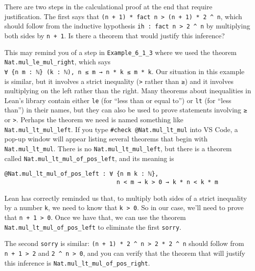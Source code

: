 \documentclass[
  letterpaper,
  DIV=11,
  numbers=noendperiod]{scrreprt}
\newenvironment{ind}
	{\begin{list}{}{\setlength{\leftmargin}{1em}}\item\relax}
	{\end{list}}
\theoremstyle{remark}
\begin{document}
There are two steps in the calculational proof at the end that require
justification. The first says that
\texttt{(n\ +\ 1)\ *\ fact\ n\ \textgreater{}\ (n\ +\ 1)\ *\ 2\ \^{}\ n},
which should follow from the inductive hypothesis
\texttt{ih\ :\ fact\ n\ \textgreater{}\ 2\ \^{}\ n} by multiplying both
sides by \texttt{n\ +\ 1}. Is there a theorem that would justify this
inference?

This may remind you of a step in \texttt{Example\_6\_1\_3} where we used
the theorem \texttt{Nat.mul\_le\_mul\_right}, which says
\texttt{∀\ \{n\ m\ :\ ℕ\}\ (k\ :\ ℕ),\ n\ ≤\ m\ →\ n\ *\ k\ ≤\ m\ *\ k}.
Our situation in this example is similar, but it involves a strict
inequality (\texttt{\textgreater{}} rather than \texttt{≥}) and it
involves multiplying on the left rather than the right. Many theorems
about inequalities in Lean's library contain either \texttt{le} (for
``less than or equal to'') or \texttt{lt} (for ``less than'') in their
names, but they can also be used to prove statements involving
\texttt{≥} or \texttt{\textgreater{}}. Perhaps the theorem we need is
named something like \texttt{Nat.mul\_lt\_mul\_left}. If you type
\texttt{\#check\ @Nat.mul\_lt\_mul} into VS Code, a pop-up window will
appear listing several theorems that begin with
\texttt{Nat.mul\_lt\_mul}. There is no \texttt{Nat.mul\_lt\_mul\_left},
but there is a theorem called \texttt{Nat.mul\_lt\_mul\_of\_pos\_left},
and its meaning is

\begin{ind}

\begin{verbatim}
@Nat.mul_lt_mul_of_pos_left : ∀ {n m k : ℕ},
                                n < m → k > 0 → k * n < k * m
\end{verbatim}

\end{ind}

Lean has correctly reminded us that, to multiply both sides of a strict
inequality by a number \texttt{k}, we need to know that
\texttt{k\ \textgreater{}\ 0}. So in our case, we'll need to prove that
\texttt{n\ +\ 1\ \textgreater{}\ 0}. Once we have that, we can use the
theorem \texttt{Nat.mul\_lt\_mul\_of\_pos\_left} to eliminate the first
\texttt{sorry}.

The second \texttt{sorry} is similar:
\texttt{(n\ +\ 1)\ *\ 2\ \^{}\ n\ \textgreater{}\ 2\ *\ 2\ \^{}\ n}
should follow from \texttt{n\ +\ 1\ \textgreater{}\ 2} and
\texttt{2\ \^{}\ n\ \textgreater{}\ 0}, and you can verify that the
theorem that will justify this inference is
\texttt{Nat.mul\_lt\_mul\_of\_pos\_right}.
\end{document}
